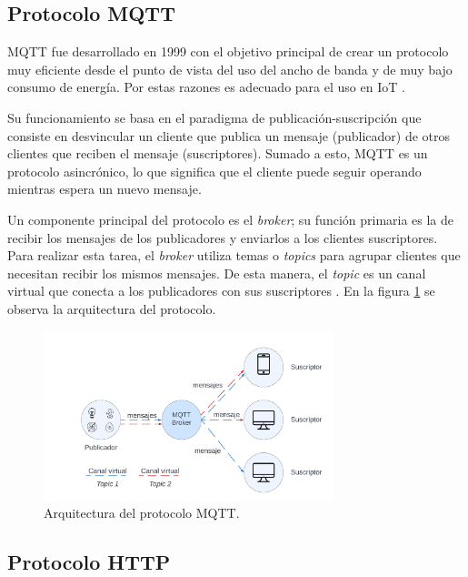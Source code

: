 \subsection{Protocolo MQTT}
\label{sec:Protocolo MQTT}

MQTT fue desarrollado en 1999 con el objetivo principal de crear un protocolo muy eficiente desde el punto de vista del uso del ancho de banda y de muy bajo consumo de energía. Por estas razones es adecuado para el uso en IoT \citep{mqtt:1}.

Su funcionamiento se basa en el paradigma de publicación-suscripción que consiste en desvincular un cliente que publica un mensaje (publicador) de otros clientes que reciben el mensaje (suscriptores). Sumado a esto, MQTT es un protocolo asincrónico, lo que significa que el cliente puede seguir operando mientras espera un nuevo mensaje.

Un componente principal del protocolo es el \textit{broker}; su función primaria es la de recibir los mensajes de los publicadores y enviarlos  a los clientes suscriptores. Para realizar esta tarea, el \textit{broker} utiliza temas o \textit{topics} para agrupar clientes que necesitan recibir los mismos mensajes. De esta manera, el \textit{topic} es un canal virtual que conecta a los publicadores con sus suscriptores \citep{mqtt:1}.
En la figura \ref{fig:arqmqtt} se observa la arquitectura del protocolo.
\begin{figure}[h]
	\centering
	\includegraphics[width=0.75\textwidth]{./Figures/mqtt.jpeg}
	\caption[Arquitectura del protocolo MQTT.]{Arquitectura del protocolo MQTT\protect\footnotemark.}
	\label{fig:arqmqtt}

\end{figure}



\subsection{Protocolo HTTP}
\label{sec:Protocolo HTTP}

